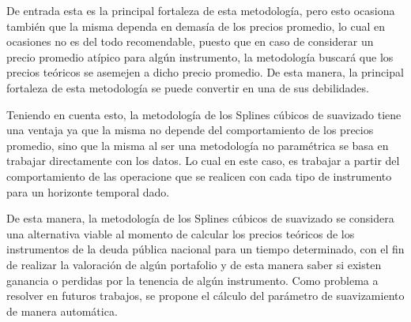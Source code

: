 \hspace{0.4cm}De entrada esta es la principal fortaleza de esta metodolog\'ia, pero esto ocasiona tambi\'en que la misma dependa en demas\'ia de los precios promedio, lo cual en ocasiones no es del todo recomendable, puesto que en caso de considerar un precio promedio at\'ipico para alg\'un instrumento, la metodolog\'ia buscar\'a que los precios te\'oricos se asemejen a dicho precio promedio. De esta manera, la principal fortaleza de esta metodolog\'ia se puede convertir en una de sus debilidades.

\hspace{0.4cm} Teniendo en cuenta esto, la metodolog\'ia de los Splines c\'ubicos de suavizado tiene una ventaja ya que la misma no depende del comportamiento de los precios promedio, sino que la misma al ser una metodolog\'ia no param\'etrica se basa en trabajar directamente con los datos. Lo cual en este caso, es trabajar a partir del comportamiento de las operacione que se realicen con cada tipo de instrumento para un horizonte temporal dado.

\hspace{0.4cm} De esta manera, la metodolog\'ia de los Splines c\'ubicos de suavizado se considera una alternativa viable al momento de calcular los precios te\'oricos de los instrumentos de la deuda p\'ublica nacional para un tiempo determinado, con el fin de realizar la valoraci\'on de alg\'un portafolio y de esta manera saber si existen ganancia o perdidas por la tenencia de alg\'un instrumento. Como problema a resolver en futuros trabajos, se propone el c\'alculo del par\'ametro de suavizamiento de manera autom\'atica. 



